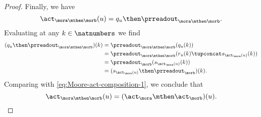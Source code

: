 \begin{proof}
    Finally, we have
    \begin{equation}
        \act_{\mora \mthen \morb}(u) = q_u \then \prreadout_{\mora \mthen \morb}.
    \end{equation}
    Evaluating at any $k \in \natnumbers$ we find
    \begin{align}
        (q_u \then \prreadout_{\mora \mthen \morb})(k) & = \prreadout_{\mora \mthen \morb}(q_u(k)) \\
                                                       & = \prreadout_{\mora \mthen \morb}(r_u(k) \tupconcat s_{\act_\mora(u)}(k)) \\
                                                       & = \prreadout_{\morb}(s_{\act_\mora(u)}(k)) \\
                                                       & = (s_{\act_\mora(u)} \then \prreadout_{\morb})(k).
    \end{align}
    Comparing with \cref{eq:Moore-act-composition-1}, we conclude that
    \begin{equation}
        \act_{\mora \mthen \morb}(u) = (\act_\mora \mthen \act_\morb)(u).
    \end{equation}
\end{proof}





